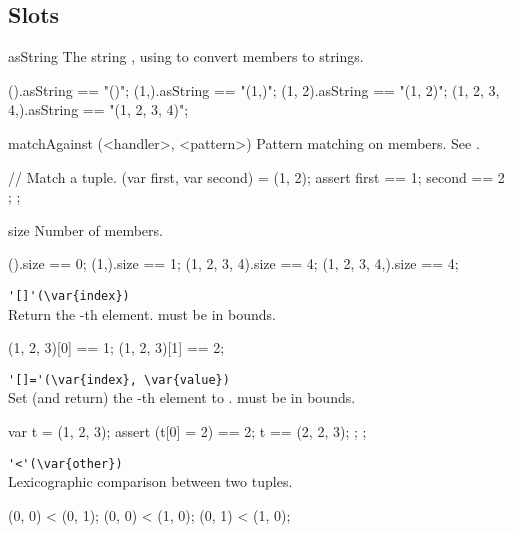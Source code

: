 \subsection{Slots}
\begin{urbiscriptapi}
\item[asString]%
  The string , using
   to convert members to strings.

\begin{urbiassert}
           ().asString == "()";
         (1,).asString == "(1,)";
       (1, 2).asString == "(1, 2)";
(1, 2, 3, 4,).asString == "(1, 2, 3, 4)";
\end{urbiassert}


\item[matchAgainst](<handler>, <pattern>)%
  Pattern matching on members.  See .
\begin{urbiscript}
{
  // Match a tuple.
  (var first, var second) = (1, 2);
  assert { first == 1; second == 2 };
};
\end{urbiscript}

\item[size] Number of members.
\begin{urbiassert}
           ().size == 0;
         (1,).size == 1;
 (1, 2, 3, 4).size == 4;
(1, 2, 3, 4,).size == 4;
\end{urbiassert}

\item \lstinline|'[]'(\var{index})|\\
  Return the -th element.   must be in bounds.
\begin{urbiassert}
(1, 2, 3)[0] == 1;
(1, 2, 3)[1] == 2;
\end{urbiassert}

\item \lstinline|'[]='(\var{index}, \var{value})|\\
  Set (and return) the -th element to .
   must be in bounds.
\begin{urbiscript}
{
  var t = (1, 2, 3);
  assert
  {
    (t[0] = 2) == 2;
    t == (2, 2, 3);
  };
};
\end{urbiscript}

\item \lstinline|'<'(\var{other})|\\
  Lexicographic comparison between two tuples.
\begin{urbiassert}
(0, 0) < (0, 1);
(0, 0) < (1, 0);
(0, 1) < (1, 0);
\end{urbiassert}


\end{urbiscriptapi}
